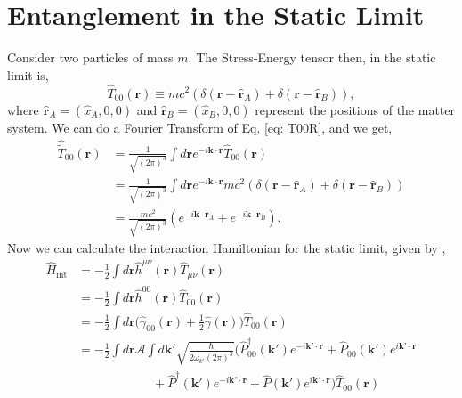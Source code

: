 \documentclass[12pt,a4paper]{report}
\theoremstyle{plain}
\theoremstyle{definition}
\theoremstyle{remark}
\newcommand{\munu}{\mu\nu}
\newcommand{\Hint}{\hat{H}_{\text{int}}}
\begin{document}
\section{Entanglement in the Static Limit}
Consider two particles of mass $m$. The Stress-Energy tensor then, in the static limit is,
\begin{equation}
    \hat{T}_{00}(\bm{r}) \equiv mc^2 (\delta(\bm{r} - \hat{\bm{r}}_A) + \delta(\bm{r} - \hat{\bm{r}}_B)),
    \label{eq: T00R}
\end{equation}
where $\hat{\bm{r}}_A = (\hat{x}_A, 0, 0)$ and $\hat{\bm{r}}_B = (\hat{x}_B, 0, 0)$ represent the positions of the matter system. We can do a Fourier Transform of Eq. \ref{eq: T00R}, and we get,
\begin{equation}
    \begin{aligned}
        \hat{\tilde{T}}_{00}(\bm{r}) &= \frac{1}{\sqrt{(2\pi)^3}}\int d\bm{r} e^{-i\bm{k}\cdot\bm{r}}\hat{T}_{00}(\bm{r}) \\
        &= \frac{1}{\sqrt{(2\pi)^3}}\int d\bm{r} e^{-i\bm{k}\cdot\bm{r}}mc^2 (\delta(\bm{r} - \hat{\bm{r}}_A) + \delta(\bm{r} - \hat{\bm{r}}_B))\\
        &= \frac{mc^2}{\sqrt{(2\pi)^3}} (e^{-i\bm{k}\cdot\bm{r}_A} + e^{-i\bm{k}\cdot\bm{r}_B}). 
    \end{aligned}
    \label{eq: T00K}
\end{equation}
Now we can calculate the interaction Hamiltonian for the static limit, given by \cite{Bose_2022, weinberg},
\begin{equation} \label{eq: HintStat}
    \begin{aligned}
        \Hint &= -\frac{1}{2} \int d\bm{r} \hat{h}^{\munu}(\bm{r})\hat{T}_{\munu}(\bm{r}) \\
        &= -\frac{1}{2} \int d\bm{r} \hat{h}^{00}(\bm{r})\hat{T}_{00}(\bm{r}) \\
        &= -\frac{1}{2} \int d\bm{r} \Big(\hat{\gamma}_{00}(\bm{r}) + \frac{1}{2}\hat{\gamma}(\bm{r})\Big)\hat{T}_{00}(\bm{r}) \\
        &= -\frac{1}{2} \int d{\bm{r}} \mathcal{A}\int d\bm{k'} \sqrt{\frac{\hbar}{2\omega_{k'} (2\pi)^3}}\Big(\hat{P}_{00}^{\dagger}(\bm{k'})e^{-i\bm{k'}\cdot\bm{r}} + \hat{P}_{00}(\bm{k'})e^{i\bm{k'}\cdot\bm{r}} \\ 
        &\qquad\qquad\qquad+ \hat{P}^{\dagger}(\bm{k'})e^{-i\bm{k'}\cdot\bm{r}} + \hat{P}(\bm{k'})e^{i\bm{k'}\cdot\bm{r}}\Big)\hat{T}_{00}(\bm{r})
    \end{aligned}
\end{equation}
\end{document}
